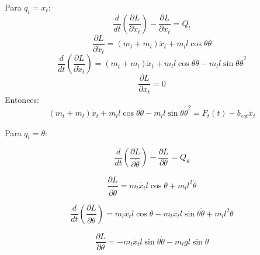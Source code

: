 \documentclass{article}
\begin{document}
            Para \(q_i = x_t\):
            \begin{equation}\label{eq:euler2}
                \frac{d}{dt}\left(\frac{\partial L}{\partial \dot{x}_t}\right)-\frac{\partial L}{\partial x_t}=Q_t
            \end{equation}
            \begin{equation}
                \frac{\partial L}{\partial \dot{x}_t}= (m_t+m_l)\dot{x}_t+m_ll\cos{\theta}\dot{\theta}
            \end{equation}
            \begin{equation}            
                    \frac{d}{dt}\left(\frac{\partial L}{\partial \dot{x}_t}\right)= 
                    (m_t+m_l)\ddot{x}_t+m_l l\cos{\theta}\ddot{\theta}-m_ll\sin{\theta}\dot{\theta}^2
            \end{equation}
            \begin{equation}
                \frac{\partial L}{\partial x_t}=0
            \end{equation}
            Entonces:
            \begin{equation}
                (m_t+m_l)\ddot{x}_t+m_l l\cos{\theta}\ddot{\theta}-m_l l\sin{\theta}\dot{\theta}^2=F_t(t)-b_{eqt} \dot{x}_t
            \end{equation}

            Para \(q_i = \theta\):

            \begin{equation}\label{eq:euler3}
                \frac{d}{dt}\left(\frac{\partial L}{\partial \dot{\theta}}\right)-\frac{\partial L}{\partial \theta}=Q_{\theta}
            \end{equation}

            \begin{equation}
                \frac{\partial L}{\partial \dot{\theta}}=m_l\dot{x_t}l\cos{\theta}+m_ll^2\dot{\theta}
            \end{equation}

            \begin{equation}
                    \frac{d}{dt}\left(\frac{\partial L}{\partial \dot{\theta}}\right)= m_l\ddot{x_t}l\cos{\theta} -m_l\dot{x_t}l\sin{\theta}\dot{\theta}+m_ll^2\ddot{\theta}
            \end{equation}

            \begin{equation}
                \frac{\partial L}{\partial \theta}=-m_l\dot{x_t}l\sin{\theta}\dot{\theta}-m_lgl\sin{\theta}
            \end{equation}
\end{document}
